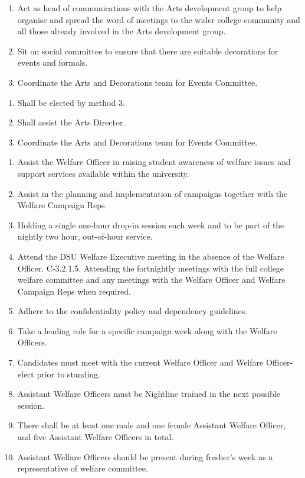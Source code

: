 \begin{enumerate}
    \item Act as head of communications with the Arts development group to help organise and spread the word of meetings to the wider college community and all those already involved in the Arts development group. 
    \item Sit on social committee to ensure that there are suitable decorations for events and formals.
    \item Coordinate the Arts and Decorations team for Events Committee.
    
\end{enumerate}

\begin{enumerate}
    \item Shall be elected by method 3.
    \item Shall assist the Arts Director. 
    \item Coordinate the Arts and Decorations team for Events Committee.
    
\end{enumerate}

\begin{enumerate}
    \item  Assist the Welfare Officer in raising student awareness of welfare issues and support
    services available within the university.
    \item Assist in the planning and implementation of campaigns together with the Welfare Campaign Reps.
    \item Holding a single one-hour drop-in session each week and to be part of the nightly two hour, out-of-hour service.
    \item  Attend the DSU Welfare Executive meeting in the absence of the Welfare Officer. C-3.2.1.5. Attending the fortnightly meetings with the full college welfare committee and any
    meetings with the Welfare Officer and Welfare Campaign Reps when required. 
    \item Adhere to the confidentiality policy and dependency guidelines.
    \item Take a leading role for a specific campaign week along with the Welfare Officers.
    \item Candidates must meet with the current Welfare Officer and Welfare Officer-elect prior to standing. 
    \item Assistant Welfare Officers must be Nightline trained in the next possible session.
    \item There shall be at least one male and one female Assistant Welfare Officer, and five Assistant Welfare Officers in total.
    \item Assistant Welfare Officers should be present during fresher’s week as a representative of welfare committee.
   
    
    
    
\end{enumerate}

